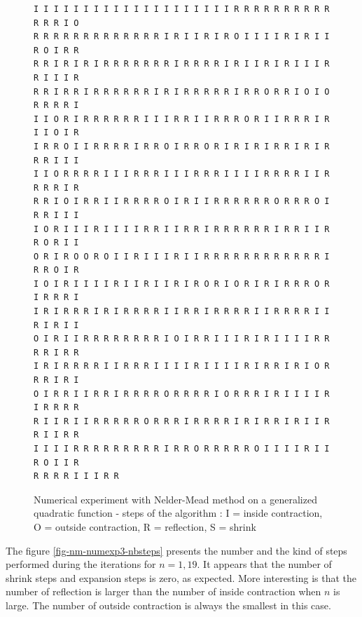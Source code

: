 \begin{figure}[htbp]
\begin{center}
\begin{verbatim}
I I I I I I I I I I I I I I I I I I I I R R R R R R R R R R R R R I O 
R R R R R R R R R R R R R I R I I R I R O I I I I R I R I I R O I R R 
R R I R I R I R R R R R R R I R R R R I R I I R I R I I I R R I I I R 
R R I R R I R R R R R R I R I R R R R R I R R O R R I O I O R R R R I 
I I O R I R R R R R R I I I R R I I R R R O R I I R R R I R I I O I R 
I R R O I I R R R R I R R O I R R O R I R I R I R R I R I R R R I I I 
I I O R R R R I I I R R R I I I R R R I I I I R R R R I I R R R R I R 
R R I O I R R I I R R R R O I R I I R R R R R R O R R R O I R R I I I 
I O R I I I R I I I I R R I I R R I R R R R R R I R R I I R R O R I I 
O R I R O O R O I I R I I I R I I R R R R R R R R R R R R I R R O I R 
I O I R I I I I R I I R I I R I R O R I O R I R I R R R O R I R R R I 
I R I R R R I R I R R R R I I R R I R R R R I I R R R R I I R I R I I 
O I R I I R R R R R R R R I O I R R I I I R I R I I I I R R R R I R R 
I R I R R R R I I R R R I I I I R I I I I R I R R I R I O R R R I R I 
O I R R I I R R I R R R R O R R R R I O R R R I R I I I I R I R R R R 
R I I R I I R R R R R O R R R I R R R R I R I R R I R I I R R I I R R 
I I I I R R R R R R R R R I R R O R R R R R O I I I I R I I R O I I R 
R R R R I I I R R
\end{verbatim}
\end{center}
\caption{Numerical experiment with Nelder-Mead method on a generalized 
quadratic function - steps of the algorithm : I = inside contraction, O = outside contraction, 
R = reflection, S = shrink}
\label{fig-nm-numexp3-steps}
\end{figure}

The figure \ref{fig-nm-numexp3-nbsteps} presents the number and 
the kind of steps performed during the iterations for $n=1,19$.
It appears that the number of shrink steps and expansion steps is zero, as expected.
More interesting is that the number of reflection is 
larger than the number of inside contraction when $n$ 
is large. The number of outside contraction is always 
the smallest in this case.

